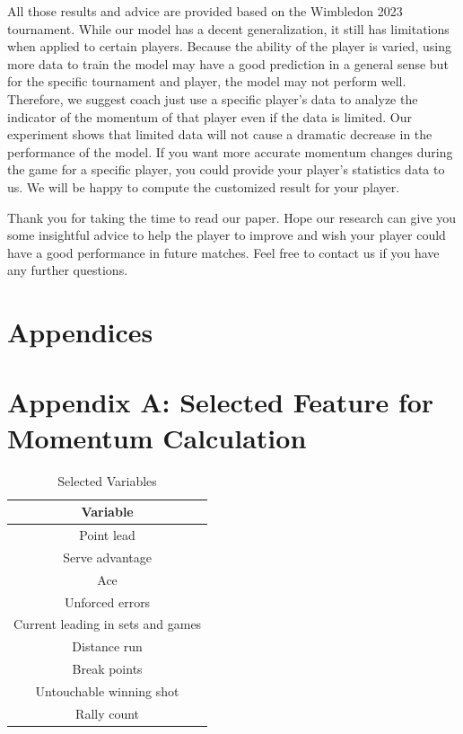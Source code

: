 \documentclass[12pt]{article}
\begin{document}
All those results and advice are provided based on the Wimbledon 2023 tournament. While our model has a decent generalization, it still has limitations when applied to certain players. Because the 
ability of the player is varied, using more data to train the model may have a good prediction in a general sense but for the specific tournament and player, the model may not perform well. Therefore, we suggest coach  
just use a specific player's data to analyze the indicator of the momentum of that player even if the data is limited. Our experiment shows that limited data will not cause a dramatic decrease in the performance of the model. If you want more accurate momentum changes during the game for a specific player, you could provide your player's statistics data to us. We will be happy to compute the customized result for your player. 

Thank you for taking the time to read our paper. Hope our research can give you some insightful advice to help the player to improve and wish your player could have a good performance in future matches. Feel free to contact us if you have any further questions.

\printbibliography

\section*{Appendices}
\section*{Appendix A: Selected Feature for Momentum Calculation}
\begin{table}[H]
\centering
\begin{tabular}{|| c ||}
\hline
 \textbf{Variable} \\ [0.5ex] 
    \hline\hline
    Point lead \\
    \hline
    Serve advantage \\
    \hline
    Ace \\
    \hline
    Unforced errors \\
    \hline
    Current leading in sets and games \\
    \hline
    Distance run \\
    \hline
    Break points \\
    \hline
    Untouchable winning shot \\
    \hline
    Rally count \\
    [1ex]
    \hline
\end{tabular}
\caption{Selected Variables}
\label{table:5}
\end{table}
\end{document}

